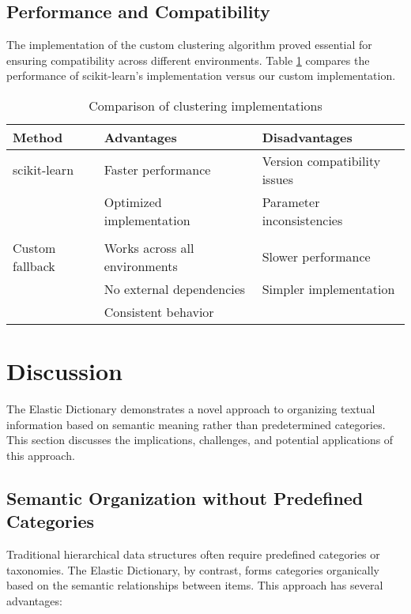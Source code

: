 \documentclass[conference]{IEEEtran}
\begin{document}
\subsection{Performance and Compatibility}

The implementation of the custom clustering algorithm proved essential for ensuring compatibility across different environments. Table \ref{tab:compatibility} compares the performance of scikit-learn's implementation versus our custom implementation.

\begin{table}[ht]
\centering
\caption{Comparison of clustering implementations}
\label{tab:compatibility}
\begin{tabular}{@{}lll@{}}
\toprule
\textbf{Method} & \textbf{Advantages} & \textbf{Disadvantages} \\
\midrule
scikit-learn & Faster performance & Version compatibility issues \\
 & Optimized implementation & Parameter inconsistencies \\
 & & \\
Custom fallback & Works across all environments & Slower performance \\
 & No external dependencies & Simpler implementation \\
 & Consistent behavior & \\
\bottomrule
\end{tabular}
\end{table}

\section{Discussion}

The Elastic Dictionary demonstrates a novel approach to organizing textual information based on semantic meaning rather than predetermined categories. This section discusses the implications, challenges, and potential applications of this approach.

\subsection{Semantic Organization without Predefined Categories}

Traditional hierarchical data structures often require predefined categories or taxonomies. The Elastic Dictionary, by contrast, forms categories organically based on the semantic relationships between items. This approach has several advantages:
\end{document}
